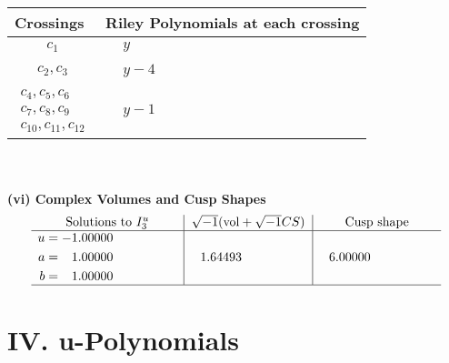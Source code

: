 \documentclass[1p]{elsarticle_modified}
\theoremstyle{definition}
\newcommand{\I}{\sqrt{-1}}
\begin{document}
\begin{tabular}{m{50pt}|m{274pt}}
Crossings & \hspace{64pt}Riley Polynomials at each crossing \\
\hline $$\begin{aligned}c_{1}\end{aligned}$$&$\begin{aligned}
&y
\end{aligned}$\\
\hline $$\begin{aligned}c_{2},c_{3}\end{aligned}$$&$\begin{aligned}
&y-4
\end{aligned}$\\
\hline $$\begin{aligned}c_{4},c_{5},c_{6}\\c_{7},c_{8},c_{9}\\c_{10},c_{11},c_{12}\end{aligned}$$&$\begin{aligned}
&y-1
\end{aligned}$\\
\hline
\end{tabular}\\~\\
\newpage\flushleft \textbf{(vi) Complex Volumes and Cusp Shapes}
$$\begin{array}{c|c|c}  
\text{Solutions to }I^u_{3}& \I (\text{vol} + \sqrt{-1}CS) & \text{Cusp shape}\\
 \hline 
\begin{aligned}
u &= -1.00000\phantom{ +0.000000I} \\
a &= \phantom{-}1.00000\phantom{ +0.000000I} \\
b &= \phantom{-}1.00000\phantom{ +0.000000I}\end{aligned}
 & \phantom{-}1.64493\phantom{ +0.000000I} & \phantom{-}6.00000\phantom{ +0.000000I}\\
 \hline 
 \end{array}$$\newpage
\newpage\renewcommand{\arraystretch}{1}
\centering \section*{ IV. u-Polynomials}
\end{document}
